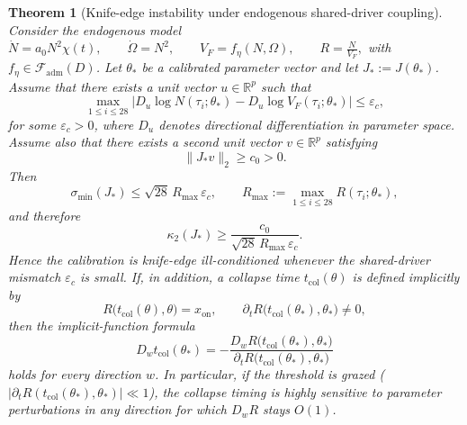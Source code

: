\documentclass[11pt]{article}
\newtheorem{theorem}{Theorem}
\begin{document}
\begin{theorem}[Knife-edge instability under endogenous shared-driver coupling]
\label{thm:S1_knifeedge}
Consider the endogenous model
$\dot N=a_0N^2\chi(t),\qquad
\dot\Omega=N^2,\qquad
V_F=f_\eta(N,\Omega),\qquad
R=\frac{N}{V_F},$
with \(f_\eta\in \mathcal F_{\mathrm{adm}}(D)\).
Let \(\theta_*\) be a calibrated parameter vector and let \(J_*:=J(\theta_*)\).
Assume that there exists a unit vector \(u\in\mathbb{R}^{p}\) such that
\begin{equation}
\max_{1\le i\le 28}
\left|
D_u \log N(\tau_i;\theta_*)-
D_u \log V_F(\tau_i;\theta_*)
\right|
\le \varepsilon_c ,
\label{eq:S1_shared_driver}
\end{equation}
for some \(\varepsilon_c>0\), where \(D_u\) denotes directional differentiation in parameter space.
Assume also that there exists a second unit vector \(v\in\mathbb{R}^{p}\) satisfying
\begin{equation}
\|J_*v\|_2\ge c_0>0.
\label{eq:S1_transverse}
\end{equation}
Then
\begin{equation}
\sigma_{\min}(J_*)
\le
\sqrt{28}\,R_{\max}\,\varepsilon_c,
\qquad
R_{\max}:=\max_{1\le i\le 28}R(\tau_i;\theta_*),
\label{eq:S1_sigma_min_bound}
\end{equation}
and therefore
\begin{equation}
\kappa_2(J_*)
\ge
\frac{c_0}{\sqrt{28}\,R_{\max}\,\varepsilon_c}.
\label{eq:S1_kappa_lower}
\end{equation}
Hence the calibration is knife-edge ill-conditioned whenever the shared-driver mismatch
\(\varepsilon_c\) is small.
If, in addition, a collapse time \(t_{\mathrm{col}}(\theta)\) is defined implicitly by
\begin{equation}
R\!\bigl(t_{\mathrm{col}}(\theta),\theta\bigr)=x_{\mathrm{on}},
\qquad
\partial_t R\!\bigl(t_{\mathrm{col}}(\theta_*),\theta_*\bigr)\neq 0,
\label{eq:S1_tc_def}
\end{equation}
then the implicit-function formula
\begin{equation}
D_w t_{\mathrm{col}}(\theta_*)=
-\frac{D_w R\!\bigl(t_{\mathrm{col}}(\theta_*),\theta_*\bigr)}
{\partial_t R\!\bigl(t_{\mathrm{col}}(\theta_*),\theta_*\bigr)}
\label{eq:S1_tc_sensitivity}
\end{equation}
holds for every direction \(w\). In particular, if the threshold is grazed
(\(|\partial_t R(t_{\mathrm{col}}(\theta_*),\theta_*)|\ll 1\)), the collapse timing is highly sensitive to parameter
perturbations in any direction for which \(D_w R\) stays \(O(1)\).
\end{theorem}
\end{document}
